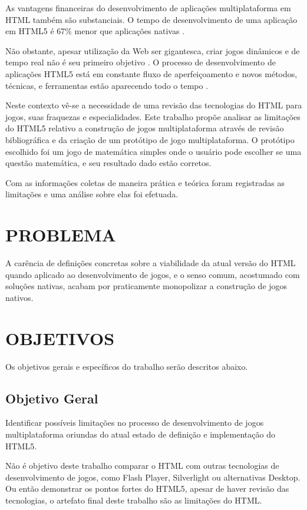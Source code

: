 As vantagens financeiras do desenvolvimento de aplicações
multiplataforma em HTML também são substanciais. O tempo de
desenvolvimento de uma aplicação em HTML5 é 67\% menor que
aplicações nativas \autocite[p. 460]{html5Tradeoffs}.

Não obstante, apesar utilização da Web ser gigantesca, criar
jogos dinâmicos e de tempo real não é seu primeiro objetivo
\autocite{html5mostwanted}. O processo de desenvolvimento de
aplicações HTML5 está em constante fluxo de aperfeiçoamento e novos
métodos, técnicas, e ferramentas estão aparecendo todo o tempo
\autocite{crossPlatformMobileGame}.

Neste contexto vê-se a necessidade de uma revisão das tecnologias do
HTML para jogos, suas fraquezas e especialidades. Este trabalho propõe
analisar as limitações do HTML5 relativo a construção de
jogos multiplataforma através de revisão bibliográfica e da criação
de um protótipo de jogo multiplataforma. O protótipo escolhido foi
um jogo de matemática simples onde o usuário pode escolher se uma
questão matemática, e seu resultado dado estão corretos.

Com as informações coletas de maneira prática e teórica foram
registradas as limitações e uma análise sobre elas foi efetuada.

\section{PROBLEMA}
A carência de definições concretas sobre a viabilidade da atual
versão do HTML quando aplicado ao desenvolvimento de jogos, e o senso
comum, acostumado com soluções nativas, acabam por praticamente
monopolizar a construção de jogos nativos.
\section{OBJETIVOS}

Os objetivos gerais e específicos do trabalho serão descritos abaixo.

\subsection{Objetivo Geral}

Identificar possíveis limitações no processo de desenvolvimento
de jogos multiplataforma oriundas do atual estado de definição e
implementação do HTML5.

Não é objetivo deste trabalho comparar o HTML com outras tecnologias
de desenvolvimento de jogos, como Flash Player, Silverlight ou
alternativas Desktop. Ou então demonstrar os pontos fortes do HTML5,
apesar de haver revisão das tecnologias, o artefato final deste
trabalho são as limitações do HTML.

